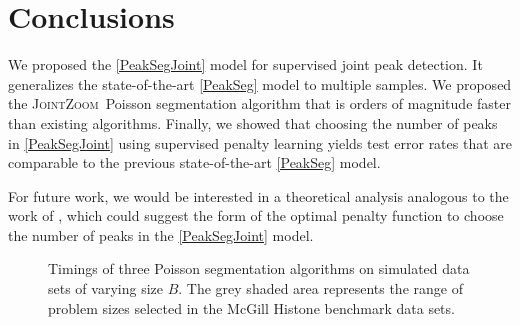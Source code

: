 \documentclass{article} %
\newcommand{\JointHeuristic}{\textsc{JointZoom}}
\begin{document}
\section{Conclusions}
\label{sec:conclusions}

We proposed the \ref{PeakSegJoint} model for supervised joint peak
detection. It generalizes the state-of-the-art \ref{PeakSeg} model to
multiple samples. We proposed the \JointHeuristic\ Poisson
segmentation algorithm that is orders of magnitude faster than
existing algorithms. Finally, we showed that choosing the number of
peaks in \ref{PeakSegJoint} using supervised penalty learning yields
test error rates that are comparable to the previous state-of-the-art
\ref{PeakSeg} model.

For future work, we would be interested in a theoretical analysis
analogous to the work of \citet{cleynen2013segmentation}, which could
suggest the form of the optimal penalty function to choose the number
of peaks in the \ref{PeakSegJoint} model.

\begin{figure}[b!]
  \centering
  
  \vskip -0.5cm
  \caption{Timings of three Poisson segmentation algorithms on
    simulated data sets of varying size $B$. The grey shaded area
    represents the range of problem sizes selected in the McGill
    Histone benchmark data sets. }
  \label{fig:timings}
\end{figure}

\newpage




\end{document}
